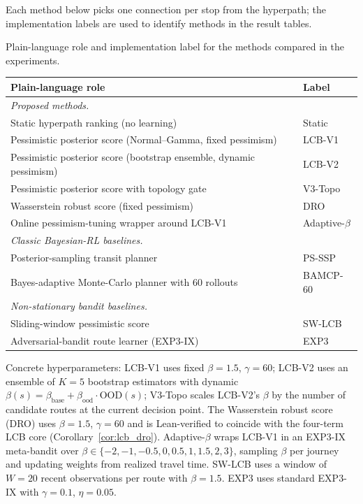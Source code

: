 \documentclass[opre,dblanonrev]{informs4}
\begin{document}
Each method below picks one connection per stop from the
hyperpath; the implementation labels are used to identify methods
in the result tables.

\begin{table}
\TABLE
{Plain-language role and implementation label for the
methods compared in the experiments.\label{tab:methods_overview}}
{\scriptsize\begin{tabular}{p{6.0cm} l}
\toprule
Plain-language role & Label \\
\midrule
\multicolumn{2}{l}{\emph{Proposed methods.}} \\
Static hyperpath ranking (no learning) & Static \\
Pessimistic posterior score (Normal--Gamma, fixed pessimism) & LCB-V1 \\
Pessimistic posterior score (bootstrap ensemble, dynamic pessimism) & LCB-V2 \\
Pessimistic posterior score with topology gate & V3-Topo \\
Wasserstein robust score (fixed pessimism) & DRO \\
Online pessimism-tuning wrapper around LCB-V1 & Adaptive-$\beta$ \\
\midrule
\multicolumn{2}{l}{\emph{Classic Bayesian-RL baselines.}} \\
Posterior-sampling transit planner~\citep{osband2017} & PS-SSP \\
Bayes-adaptive Monte-Carlo planner with 60 rollouts~\citep{guez2012} & BAMCP-60 \\
\midrule
\multicolumn{2}{l}{\emph{Non-stationary bandit baselines.}} \\
Sliding-window pessimistic score~\citep{garivier2011} & SW-LCB \\
Adversarial-bandit route learner (EXP3-IX)~\citep{kocak2014} & EXP3 \\
\bottomrule
\end{tabular}}
{}
\end{table}

Concrete hyperparameters: LCB-V1 uses fixed $\beta{=}1.5$,
$\gamma{=}60$; LCB-V2 uses an ensemble of $K{=}5$ bootstrap
estimators with dynamic $\beta(s) = \beta_{\mathrm{base}} +
\beta_{\mathrm{ood}}\!\cdot\!\mathrm{OOD}(s)$; V3-Topo scales
LCB-V2's $\beta$ by the number of candidate routes at the current
decision point. The Wasserstein robust score (DRO) uses
$\beta{=}1.5$, $\gamma{=}60$ and is Lean-verified to coincide
with the four-term LCB core
(Corollary~\ref{cor:lcb_dro}). Adaptive-$\beta$ wraps LCB-V1 in an
EXP3-IX meta-bandit over $\beta \in \{-2,-1,-0.5,0,0.5,1,1.5,2,3\}$,
sampling $\beta$ per journey and updating weights from realized
travel time. SW-LCB uses a window of $W{=}20$ recent observations
per route with $\beta{=}1.5$. EXP3 uses standard EXP3-IX with
$\gamma{=}0.1$, $\eta{=}0.05$.
\end{document}
